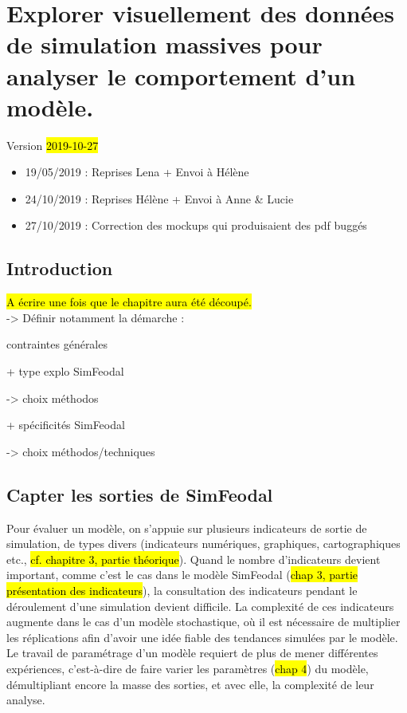 \chapter{Explorer visuellement des données de simulation massives pour analyser le comportement d'un modèle.}
\label{chap:chap5}
\begin{center}
{\large Version \hl{2019-10-27}}
\end{center}
\begin{itemize}
	\item 19/05/2019 : Reprises Lena + Envoi à Hélène
	\item 24/10/2019 : Reprises Hélène + Envoi à Anne \& Lucie
	\item 27/10/2019 : Correction des mockups qui produisaient des pdf buggés
\end{itemize} 
\setcounter{minitocdepth}{2}
\minitoc

\clearpage
\section*{Introduction}
\hl{A écrire une fois que le chapitre aura été découpé.}\\
-> Définir notamment la démarche :
\begin{compactitem}
	\item contraintes générales
	\item + type explo SimFeodal
	\item -> choix méthodos
	\item + spécificités SimFeodal
	\item -> choix méthodos/techniques
\end{compactitem}
		


\clearpage
\section[Capter les sorties de SimFeodal]{{Capter les sorties de SimFeodal}%
	}\label{sec:sorties-simfeodal}

Pour évaluer un modèle, on s'appuie sur plusieurs indicateurs de sortie de simulation, de types divers (indicateurs numériques, graphiques, cartographiques etc., \hl{cf. chapitre 3, partie théorique}).
Quand le nombre d'indicateurs devient important, comme c'est le cas dans le modèle SimFeodal (\hl{chap 3, partie présentation des indicateurs}), la consultation des indicateurs pendant le déroulement d'une simulation devient difficile.
La complexité de ces indicateurs augmente dans le cas d'un modèle stochastique, où il est nécessaire de multiplier les réplications afin d'avoir une idée fiable des tendances simulées par le modèle.
Le travail de paramétrage d'un modèle requiert de plus de mener différentes expériences, c'est-à-dire de faire varier les paramètres (\hl{chap 4}) du modèle, démultipliant encore la masse des sorties, et avec elle, la complexité de leur analyse.

